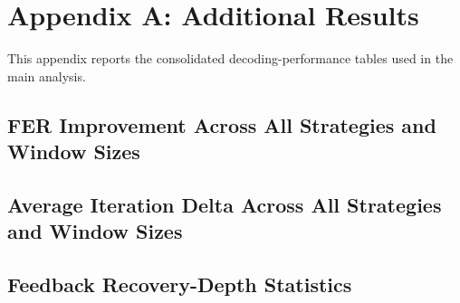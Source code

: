 
\appendix
\clearpage
\section*{Appendix A: Additional Results}
\label{app:additional-results}

This appendix reports the consolidated decoding-performance tables used in the main analysis.

\subsection{FER Improvement Across All Strategies and Window Sizes}
\label{app:fer-all-windows}


\subsection{Average Iteration Delta Across All Strategies and Window Sizes}
\label{app:iter-all-windows}


\subsection{Feedback Recovery-Depth Statistics}
\label{app:feedback-recovery-depth}

